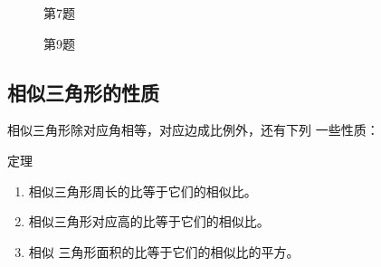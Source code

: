 \begin{figure}
    \begin{minipage}[t]{0.48\linewidth}
    \centering
  \begin{tikzpicture}[>=latex, scale=1]
    \end{tikzpicture}
    \caption*{第7题}
    \end{minipage}
    \begin{minipage}[t]{0.48\linewidth}
    \centering
    \begin{tikzpicture}[>=latex, scale=1]

    \end{tikzpicture}
    \caption*{第9题}
    \end{minipage}
    \end{figure}

\subsection{相似三角形的性质}
相似三角形除对应角相等，对应边成比例外，还有下列
一些性质：

\begin{Theorem}
    {定理}
\begin{enumerate}
    \item 相似三角形周长的比等于它们的相似比。
    \item 相似三角形对应高的比等于它们的相似比。
    \item 相似
三角形面积的比等于它们的相似比的平方。
\end{enumerate}
\end{Theorem}

